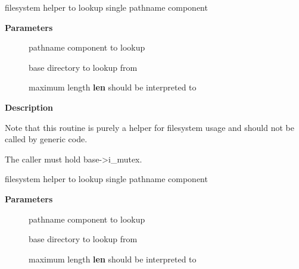 \documentclass[a4paper,8pt,english]{sphinxmanual}
\begin{document}
\begin{fulllineitems}
\label{filesystems/index:c.lookup_one_len}
filesystem helper to lookup single pathname component

\end{fulllineitems}


\textbf{Parameters}
\begin{description}
\item[{}] \leavevmode
pathname component to lookup

\item[{}] \leavevmode
base directory to lookup from

\item[{}] \leavevmode
maximum length \textbf{len} should be interpreted to

\end{description}

\textbf{Description}

Note that this routine is purely a helper for filesystem usage and should
not be called by generic code.

The caller must hold base-\textgreater{}i\_mutex.

\begin{fulllineitems}
\label{filesystems/index:c.lookup_one_len_unlocked}
filesystem helper to lookup single pathname component

\end{fulllineitems}


\textbf{Parameters}
\begin{description}
\item[{}] \leavevmode
pathname component to lookup

\item[{}] \leavevmode
base directory to lookup from

\item[{}] \leavevmode
maximum length \textbf{len} should be interpreted to

\end{description}
\end{document}
